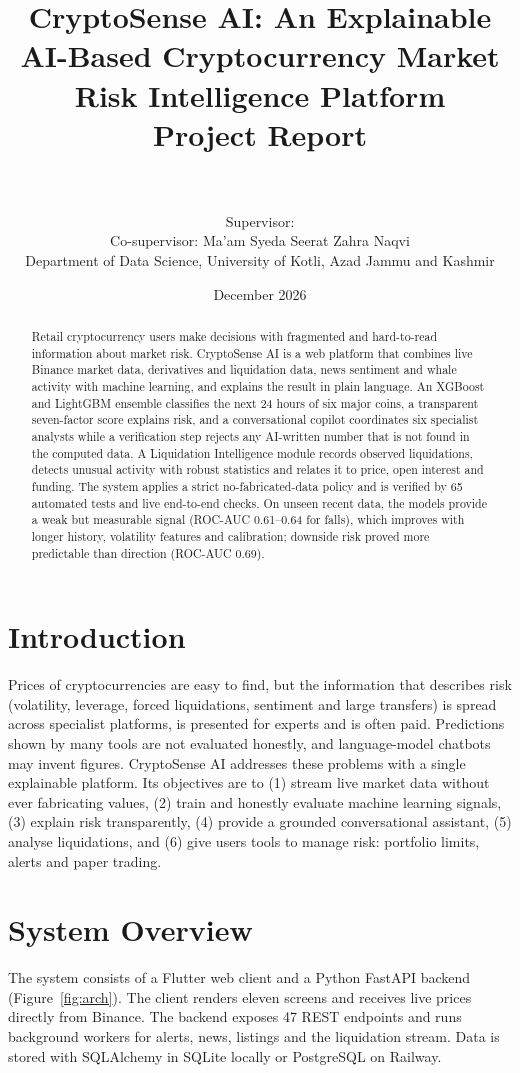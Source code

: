 \documentclass[11pt,a4paper]{article}
\title{\textbf{CryptoSense AI: An Explainable AI-Based Cryptocurrency Market Risk Intelligence Platform}\\[6pt]\large Project Report}
\author{\studentA\\ \studentB\\[4pt] Supervisor: \supervisor\\ Co-supervisor: Ma'am Syeda Seerat Zahra Naqvi\\[4pt] Department of Data Science, University of Kotli, Azad Jammu and Kashmir}
\date{December 2026}
\begin{document}
\maketitle

\begin{abstract}
Retail cryptocurrency users make decisions with fragmented and hard-to-read information about market risk. CryptoSense AI is a web platform that combines live Binance market data, derivatives and liquidation data, news sentiment and whale activity with machine learning, and explains the result in plain language. An XGBoost and LightGBM ensemble classifies the next 24 hours of six major coins, a transparent seven-factor score explains risk, and a conversational copilot coordinates six specialist analysts while a verification step rejects any AI-written number that is not found in the computed data. A Liquidation Intelligence module records observed liquidations, detects unusual activity with robust statistics and relates it to price, open interest and funding. The system applies a strict no-fabricated-data policy and is verified by 65 automated tests and live end-to-end checks. On unseen recent data, the models provide a weak but measurable signal (ROC-AUC 0.61--0.64 for falls), which improves with longer history, volatility features and calibration; downside risk proved more predictable than direction (ROC-AUC 0.69).
\end{abstract}

\section{Introduction}
Prices of cryptocurrencies are easy to find, but the information that describes risk (volatility, leverage, forced liquidations, sentiment and large transfers) is spread across specialist platforms, is presented for experts and is often paid. Predictions shown by many tools are not evaluated honestly, and language-model chatbots may invent figures. CryptoSense AI addresses these problems with a single explainable platform. Its objectives are to (1) stream live market data without ever fabricating values, (2) train and honestly evaluate machine learning signals, (3) explain risk transparently, (4) provide a grounded conversational assistant, (5) analyse liquidations, and (6) give users tools to manage risk: portfolio limits, alerts and paper trading.

\section{System Overview}
The system consists of a Flutter web client and a Python FastAPI backend (Figure~\ref{fig:arch}). The client renders eleven screens and receives live prices directly from Binance. The backend exposes 47 REST endpoints and runs background workers for alerts, news, listings and the liquidation stream. Data is stored with SQLAlchemy in SQLite locally or PostgreSQL on Railway.
\end{document}
